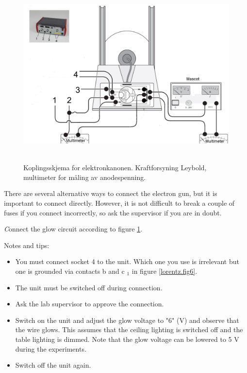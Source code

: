 \documentclass[../Elmag-labhefte-2020.tex]{subfiles}
\begin{document}
\begin{figure}[!ht]
\RawFloats
    \centering
    \includegraphics[width=14cm,height=9.49cm,keepaspectratio]{fig/Lorentz03-New.pdf}
    \caption{%
        Koplingsskjema for elektronkanonen. Kraftforsyning Leybold, multimeter for måling av anodespenning.
    }
    \label{lorentz.fig7}
\end{figure}

There are several alternative ways to connect the electron gun, but it is important to connect directly. However, it is not difficult to break a couple of fuses if you connect incorrectly, so ask the supervisor if you are in doubt.

{\emph Connect the glow circuit according to figure \ref{lorentz.fig7}.}

Notes and tips:
\vspace{-4mm}
\begin{itemize}
    \item You must connect socket 4 to the unit. Which one you use is irrelevant but one is grounded via contacts b and c $_1$ in figure \ref{lorentz.fig6}.
    \item The unit must be switched off during connection.
    \item Ask the lab supervisor to approve the connection.
    \item Switch on the unit and adjust the glow voltage to "6" (V) and observe that the wire glows. This assumes that the ceiling lighting is switched off and the table lighting is dimmed. Note that the glow voltage can be lowered to 5 V during the experiments.
    \item Switch off the unit again.
\end{itemize}
\end{document}
